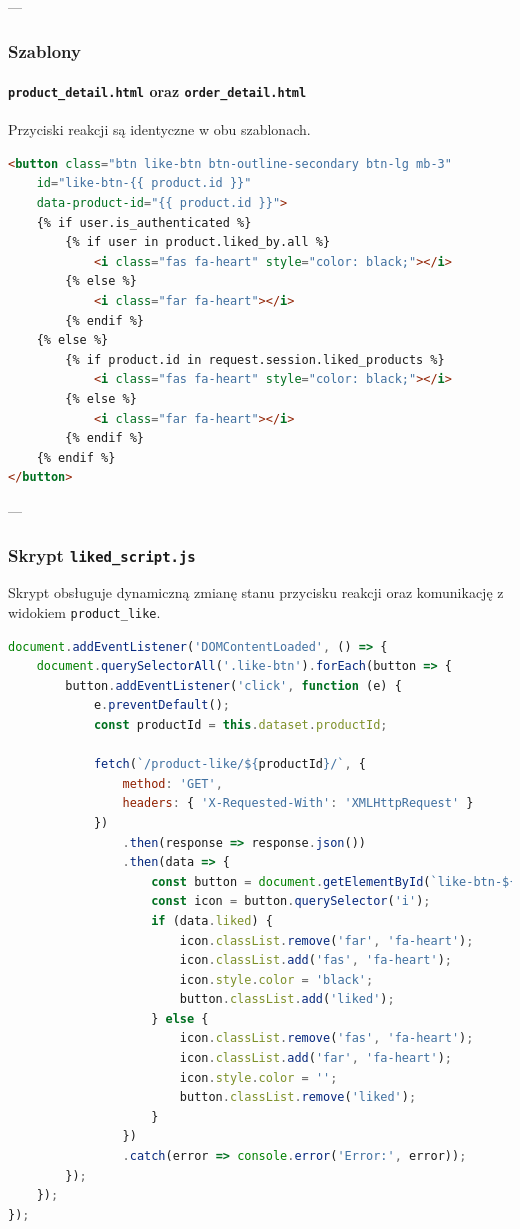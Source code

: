 \documentclass[12pt,a4paper,oneside]{article}
\theoremstyle{definition}
\numberwithin{equation}{section}
\begin{document}
---

\subsubsection{Szablony}

\paragraph{\texttt{product\_detail.html} oraz \texttt{order\_detail.html}}
Przyciski reakcji są identyczne w obu szablonach. 

\begin{lstlisting}[language=HTML, caption=Przycisk reakcji]
<button class="btn like-btn btn-outline-secondary btn-lg mb-3"
    id="like-btn-{{ product.id }}"
    data-product-id="{{ product.id }}">
    {% if user.is_authenticated %}
        {% if user in product.liked_by.all %}
            <i class="fas fa-heart" style="color: black;"></i>
        {% else %}
            <i class="far fa-heart"></i>
        {% endif %}
    {% else %}
        {% if product.id in request.session.liked_products %}
            <i class="fas fa-heart" style="color: black;"></i>
        {% else %}
            <i class="far fa-heart"></i>
        {% endif %}
    {% endif %}
</button>
\end{lstlisting}

---

\subsubsection{Skrypt \texttt{liked\_script.js}}
Skrypt obsługuje dynamiczną zmianę stanu przycisku reakcji oraz komunikację z widokiem \texttt{product\_like}.

\begin{lstlisting}[language=JavaScript, caption=Skrypt \texttt{liked\_script.js}]
document.addEventListener('DOMContentLoaded', () => {
    document.querySelectorAll('.like-btn').forEach(button => {
        button.addEventListener('click', function (e) {
            e.preventDefault();
            const productId = this.dataset.productId;

            fetch(`/product-like/${productId}/`, {
                method: 'GET',
                headers: { 'X-Requested-With': 'XMLHttpRequest' }
            })
                .then(response => response.json())
                .then(data => {
                    const button = document.getElementById(`like-btn-${productId}`);
                    const icon = button.querySelector('i');
                    if (data.liked) {
                        icon.classList.remove('far', 'fa-heart');
                        icon.classList.add('fas', 'fa-heart');
                        icon.style.color = 'black';
                        button.classList.add('liked');
                    } else {
                        icon.classList.remove('fas', 'fa-heart');
                        icon.classList.add('far', 'fa-heart');
                        icon.style.color = '';
                        button.classList.remove('liked');
                    }
                })
                .catch(error => console.error('Error:', error));
        });
    });
});
\end{lstlisting}
\end{document}
